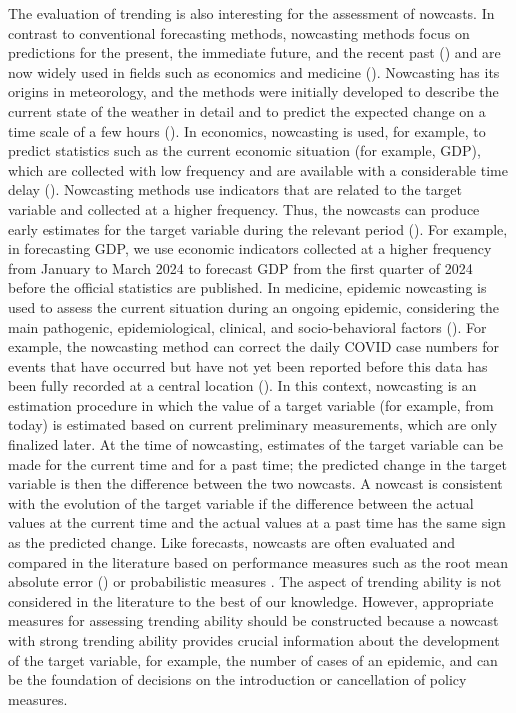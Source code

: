 The evaluation of trending is also interesting for the assessment of nowcasts.
In contrast to conventional forecasting methods, nowcasting methods focus on predictions for the present, the immediate future, and the recent past (\cite{banbura2013now}) and are now widely used in fields such as economics and medicine (\cite{bok2018macroeconomic, wolffram2023collaborative}).
Nowcasting has its origins in meteorology, and the methods were initially developed to describe the current state of the weather in detail and to predict the expected change on a time scale of a few hours (\cite{browning1989nowcasting,schmid2019nowcasting}). In economics, nowcasting is used, for example, to predict statistics such as the current economic situation (for example, GDP), which are collected with low frequency and are available with a considerable time delay (\cite{banbura2013now}).
Nowcasting methods use indicators that are related to the target variable and collected at a higher frequency.
Thus, the nowcasts can produce early estimates for the target variable during the relevant period (\cite{castle2017forecasting}). For example, in forecasting GDP, we use economic indicators collected at a higher frequency from January to March 2024 to forecast GDP from the first quarter of 2024 before the official statistics are published.
In medicine, epidemic nowcasting is used to assess the current situation during an ongoing epidemic, considering the main pathogenic, epidemiological, clinical, and socio-behavioral factors (\cite{wu2021nowcasting}). 
For example, the nowcasting method can correct the daily COVID case numbers for events that have occurred but have not yet been reported before this data has been fully recorded at a central location (\cite{gunther2021nowcasting}). 
In this context, nowcasting is an estimation procedure in which the value of a target variable (for example, from today) is estimated based on current preliminary measurements, which are only finalized later. 
At the time of nowcasting, estimates of the target variable can be made for the current time and for a past time; the predicted change in the target variable is then the difference between the two nowcasts. A nowcast is consistent with the evolution of the target variable if the difference between the actual values at the current time and the actual values at a past time has the same sign as the predicted change. Like forecasts, nowcasts are often evaluated and compared in the literature based on performance measures such as the root mean absolute error (\cite{gunther2021nowcasting}) or probabilistic measures \parencite{Wolffram2023}. The aspect of trending ability is not considered in the literature to the best of our knowledge. However, appropriate measures for assessing trending ability should be constructed because a nowcast with strong trending ability provides crucial information about the development of the target variable, for example, the number of cases of an epidemic, and can be the foundation of decisions on the introduction or cancellation of policy measures.

